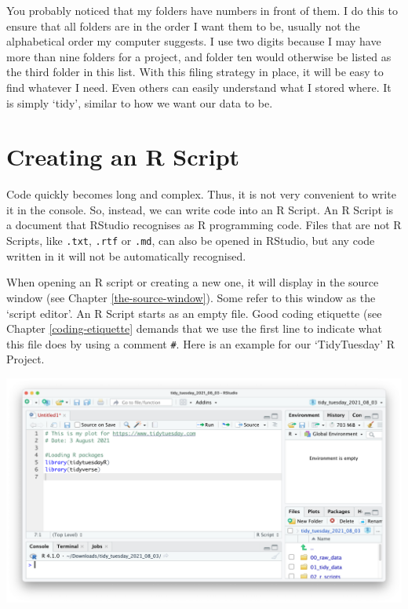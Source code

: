\documentclass[
]{book}
\begin{document}
You probably noticed that my folders have numbers in front of them. I do this to ensure that all folders are in the order I want them to be, usually not the alphabetical order my computer suggests. I use two digits because I may have more than nine folders for a project, and folder ten would otherwise be listed as the third folder in this list. With this filing strategy in place, it will be easy to find whatever I need. Even others can easily understand what I stored where. It is simply `tidy', similar to how we want our data to be.

\hypertarget{creating-an-r-script}{%
\section{Creating an R Script}\label{creating-an-r-script}}

Code quickly becomes long and complex. Thus, it is not very convenient to write it in the console. So, instead, we can write code into an R Script. An R Script is a document that RStudio recognises as R programming code. Files that are not R Scripts, like \texttt{.txt}, \texttt{.rtf} or \texttt{.md}, can also be opened in RStudio, but any code written in it will not be automatically recognised.

When opening an R script or creating a new one, it will display in the source window (see Chapter \ref{the-source-window}). Some refer to this window as the `script editor'. An R Script starts as an empty file. Good coding etiquette (see Chapter \ref{coding-etiquette} demands that we use the first line to indicate what this file does by using a comment \texttt{\#}. Here is an example for our `TidyTuesday' R Project.

\includegraphics{images/chapter_06_img/02_r_script/00_r_script.png}
\end{document}
